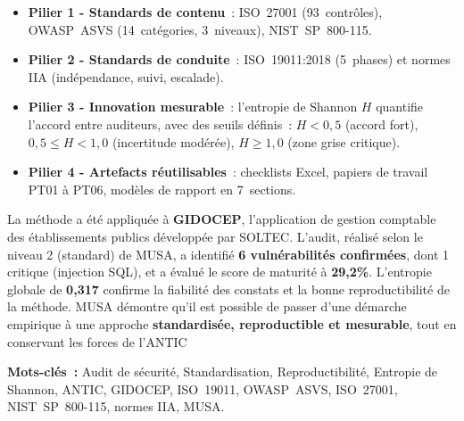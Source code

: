 \documentclass[12pt,a4paper,oneside]{report}
\begin{document}
\begin{itemize}[label={\color{gold}}, leftmargin=2em, itemsep=2pt]
	\item \textbf{Pilier 1 - Standards de contenu}~: ISO~27001
	(93~contrôles), OWASP~ASVS (14~catégories, 3~niveaux),
	NIST~SP~800-115.
	
	\item \textbf{Pilier 2 - Standards de conduite}~: ISO~19011:2018
	(5~phases) et normes IIA (indépendance, suivi, escalade).
	
	\item \textbf{Pilier 3 - Innovation mesurable}~: l'entropie de
	Shannon $H$ quantifie l'accord entre auditeurs, avec des seuils
	définis~: $H < 0{,}5$ (accord fort), $0{,}5 \leq H < 1{,}0$
	(incertitude modérée), $H \geq 1{,}0$ (zone grise critique).
	
	\item \textbf{Pilier 4 - Artefacts réutilisables}~: checklists
	Excel, papiers de travail PT01 à PT06, modèles de rapport en
	7~sections.
\end{itemize}

\medskip
La méthode a été appliquée à \textbf{GIDOCEP}, l'application de gestion
comptable des établissements publics développée par SOLTEC. L'audit,
réalisé selon le niveau 2 (standard) de MUSA, a identifié
\textbf{6 vulnérabilités confirmées}, dont 1 critique (injection SQL),
et a évalué le score de maturité à \textbf{29,2\%}. L'entropie globale
de \textbf{0,317} confirme la fiabilité des constats et la bonne
reproductibilité de la méthode. MUSA démontre qu'il est possible de passer d'une démarche empirique à
une approche \textbf{standardisée, reproductible et mesurable}, tout
en conservant les forces de l'ANTIC~

\begin{goldbox}
	\noindent\textbf{Mots-clés~:} Audit de sécurité, Standardisation,
	Reproductibilité, Entropie de Shannon, ANTIC, GIDOCEP, ISO~19011,
	OWASP~ASVS, ISO~27001, NIST~SP~800-115, normes IIA, MUSA.
\end{goldbox}
\newpage
\end{document}
